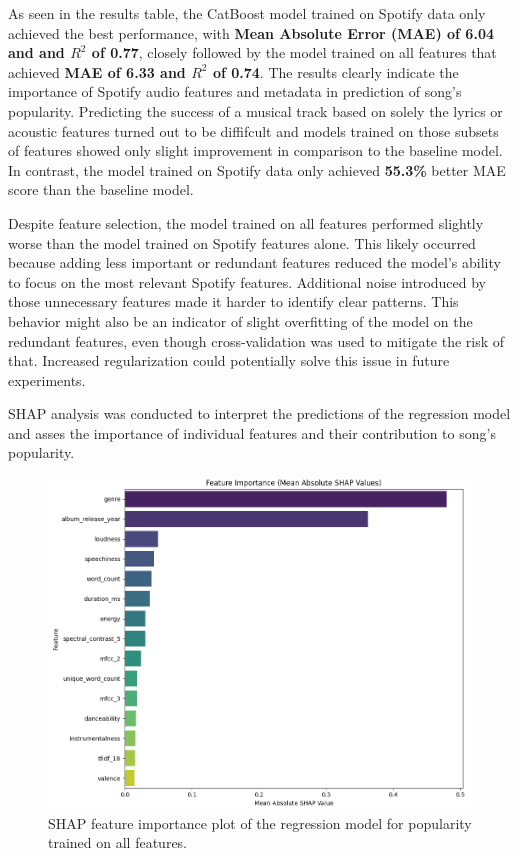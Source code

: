 As seen in the results table, the CatBoost model trained on Spotify data only
achieved the best performance, with \textbf{Mean Absolute Error (MAE) of
\textbf{6.04} and and $R^2$ of 0.77}, closely followed by the model trained on
all features that achieved \textbf{MAE of 6.33 and $R^2$ of 0.74}. The results
clearly indicate the importance of Spotify audio features and metadata in
prediction of song's popularity. Predicting the success  of a musical track
based on solely the lyrics or acoustic features turned out to be diffifcult and
models trained on those subsets of features showed only slight improvement in
comparison to the baseline model. In contrast, the model trained on Spotify data only
achieved \textbf{55.3\%} better MAE score than the baseline model.

Despite feature selection, the model trained on all features performed slightly
worse than the model trained on Spotify features alone. This likely occurred
because adding less important or redundant features reduced the model's ability
to focus on the most relevant Spotify features. Additional noise introduced by
those unnecessary features made it harder to identify clear patterns. This
behavior might also be an indicator of slight overfitting of the model on the
redundant features, even though cross-validation was used to mitigate the risk
of that. Increased regularization could potentially solve this issue in
future experiments.


SHAP analysis was conducted to interpret the predictions of the regression
model and asses the importance of individual features and their contribution to
song's popularity.


\begin{center}
\begin{figure}[H]
  \centering
  \includegraphics[width=5in]{img/feature_importance_popularity_reg.png}
  \caption{SHAP feature importance plot of the regression model for popularity trained on all features.}
  \label{Figure:fig_beh}
\end{figure}
\end{center}


